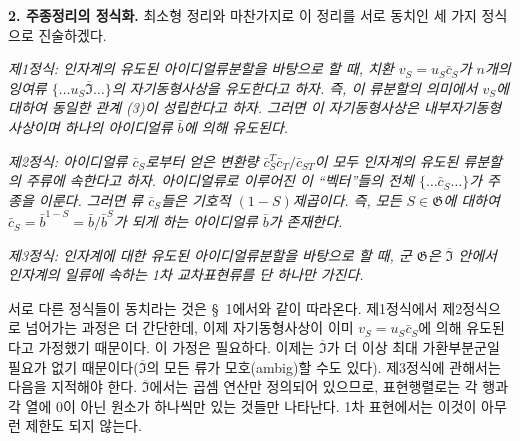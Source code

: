 
\noindent\textbf{2. 주종정리의 정식화.} 최소형 정리와 마찬가지로 이 정리를 서로 동치인 세 가지 정식으로 진술하겠다.

\emph{제1정식: 인자계의 유도된 아이디얼류분할을 바탕으로 할 때, 치환 \(v_S=u_S\bar c_S\)가 \(n\)개의 잉여류 \(\{\ldots u_S\overline{\mathfrak I}\ldots\}\)의 자기동형사상을 유도한다고 하자. 즉, 이 류분할의 의미에서 \(v_S\)에 대하여 동일한 관계 (3)이 성립한다고 하자. 그러면 이 자기동형사상은 내부자기동형사상이며 하나의 아이디얼류 \(\bar b\)에 의해 유도된다.}

\emph{제2정식: 아이디얼류 \(\bar c_S\)로부터 얻은 변환량 \(\bar c_S^T\bar c_T/\bar c_{ST}\)이 모두 인자계의 유도된 류분할의 주류에 속한다고 하자. 아이디얼류로 이루어진 이 ``벡터''들의 전체 \(\{\ldots\bar c_S\ldots\}\)가 주종을 이룬다. 그러면 류 \(\bar c_S\)들은 기호적 \((1-S)\)제곱이다. 즉, 모든 \(S\in\mathfrak G\)에 대하여 \(\bar c_S=\bar b^{1-S}=\bar b/\bar b^S\)가 되게 하는 아이디얼류 \(\bar b\)가 존재한다.}

\emph{제3정식: 인자계에 대한 유도된 아이디얼류분할을 바탕으로 할 때, 군 \(\mathfrak G\)은 \(\overline{\mathfrak I}\) 안에서 인자계의 일류에 속하는 1차 교차표현류를 단 하나만 가진다.}

서로 다른 정식들이 동치라는 것은 §~1에서와 같이 따라온다. 제1정식에서 제2정식으로 넘어가는 과정은 더 간단한데, 이제 자기동형사상이 이미 \(v_S=u_S\bar c_S\)에 의해 유도된다고 가정했기 때문이다. 이 가정은 필요하다. 이제는 \(\overline{\mathfrak I}\)가 더 이상 최대 가환부분군일 필요가 없기 때문이다(\(\overline{\mathfrak I}\)의 모든 류가 모호(ambig)할 수도 있다). 제3정식에 관해서는 다음을 지적해야 한다. \(\overline{\mathfrak I}\)에서는 곱셈 연산만 정의되어 있으므로, 표현행렬로는 각 행과 각 열에 0이 아닌 원소가 하나씩만 있는 것들만 나타난다. 1차 표현에서는 이것이 아무런 제한도 되지 않는다.
